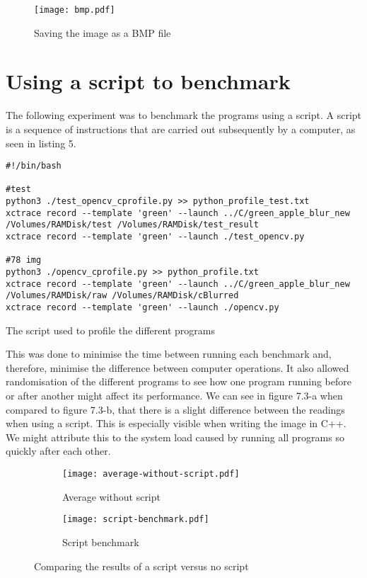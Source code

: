 \begin{figure}[H]
	\centering
	\texttt{[image: bmp.pdf]}
	\caption{Saving the image as a BMP file}
	\label{figure:bmp}
\end{figure}

\section{Using a script to benchmark}
The following experiment was to benchmark the programs using a script. A script is a sequence of instructions that are carried out subsequently by a computer, as seen in listing 5.

\begin{listing}[!ht]
	\begin{verbatim}
#!/bin/bash

#test
python3 ./test_opencv_cprofile.py >> python_profile_test.txt
xctrace record --template 'green' --launch ../C/green_apple_blur_new
/Volumes/RAMDisk/test /Volumes/RAMDisk/test_result
xctrace record --template 'green' --launch ./test_opencv.py

#78 img
python3 ./opencv_cprofile.py >> python_profile.txt
xctrace record --template 'green' --launch ../C/green_apple_blur_new
/Volumes/RAMDisk/raw /Volumes/RAMDisk/cBlurred
xctrace record --template 'green' --launch ./opencv.py
	\end{verbatim}
	\caption{The script used to profile the different programs}
	\label{listing:script}
	\end{listing}

This was done to minimise the time between running each benchmark and, therefore, minimise the difference between computer operations. It also allowed randomisation of the different programs to see how one program running before or after another might affect its performance.
We can see in figure 7.3-a when compared to figure 7.3-b, that there is a slight difference between the readings when using a script. This is especially visible when writing the image in C++. We might attribute this to the system load caused by running all programs so quickly after each other.

\begin{figure}[H]
	\centering
	\begin{subfigure}{.5\textwidth}
	  \centering
	  \texttt{[image: average-without-script.pdf]}
	  \caption{Average without script}
	  \label{fig:no-script}
	\end{subfigure}%
	\begin{subfigure}{.5\textwidth}
	  \centering
	  \texttt{[image: script-benchmark.pdf]}
	  \caption{Script benchmark}
	  \label{fig:script}
	\end{subfigure}
	\caption{Comparing the results of a script versus no script}
	\label{fig:script-vs-noscript}
\end{figure}


